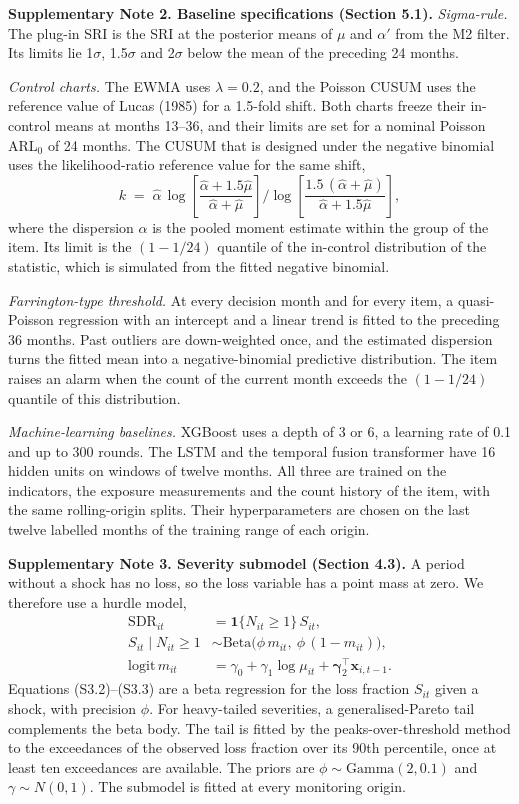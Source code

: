 \documentclass[10pt,a4paper]{article}
\begin{document}
\textbf{Supplementary Note 2. Baseline specifications (Section 5.1).}
\textit{Sigma-rule.} The plug-in SRI is the SRI at the posterior means of $\mu$ and $\alpha'$ from the M2 filter. Its limits lie 1$\sigma$, 1.5$\sigma$ and 2$\sigma$ below the mean of the preceding 24 months.

\textit{Control charts.} The EWMA uses $\lambda = 0.2$, and the Poisson CUSUM uses the reference value of Lucas (1985) for a 1.5-fold shift. Both charts freeze their in-control means at months 13--36, and their limits are set for a nominal Poisson ARL$_0$ of 24 months. The CUSUM that is designed under the negative binomial uses the likelihood-ratio reference value for the same shift,
\[
k \;=\; \hat{\alpha}\,\log\!\left[\frac{\hat{\alpha} + 1.5\hat{\mu}}{\hat{\alpha} + \hat{\mu}}\right] \Big/ \log\!\left[\frac{1.5\,(\hat{\alpha} + \hat{\mu})}{\hat{\alpha} + 1.5\hat{\mu}}\right],
\]
where the dispersion $\hat{\alpha}$ is the pooled moment estimate within the group of the item. Its limit is the $(1 - 1/24)$ quantile of the in-control distribution of the statistic, which is simulated from the fitted negative binomial.

\textit{Farrington-type threshold.} At every decision month and for every item, a quasi-Poisson regression with an intercept and a linear trend is fitted to the preceding 36 months. Past outliers are down-weighted once, and the estimated dispersion turns the fitted mean into a negative-binomial predictive distribution. The item raises an alarm when the count of the current month exceeds the $(1 - 1/24)$ quantile of this distribution.

\textit{Machine-learning baselines.} XGBoost uses a depth of 3 or 6, a learning rate of 0.1 and up to 300 rounds. The LSTM and the temporal fusion transformer have 16 hidden units on windows of twelve months. All three are trained on the indicators, the exposure measurements and the count history of the item, with the same rolling-origin splits. Their hyperparameters are chosen on the last twelve labelled months of the training range of each origin.

\textbf{Supplementary Note 3. Severity submodel (Section 4.3).}
A period without a shock has no loss, so the loss variable has a point mass at zero. We therefore use a hurdle model,
\begin{align}\mathrm{SDR}_{it} &= \mathbf{1}\{N_{it}\ge 1\}\,S_{it}, \tag{S3.1}\\ S_{it}\mid N_{it}\ge 1 &\sim \mathrm{Beta}\big(\phi\,m_{it},\ \phi\,(1-m_{it})\big), \tag{S3.2}\\ \mathrm{logit}\,m_{it} &= \gamma_{0} + \gamma_{1}\log\mu_{it} + \boldsymbol{\gamma}_{2}^{\top}\mathbf{x}_{i,t-1}. \tag{S3.3}\end{align}
Equations (S3.2)--(S3.3) are a beta regression for the loss fraction $S_{it}$ given a shock, with precision $\phi$. For heavy-tailed severities, a generalised-Pareto tail complements the beta body. The tail is fitted by the peaks-over-threshold method to the exceedances of the observed loss fraction over its 90th percentile, once at least ten exceedances are available. The priors are $\phi \sim \mathrm{Gamma}(2, 0.1)$ and $\gamma \sim N(0,1)$. The submodel is fitted at every monitoring origin.
\end{document}
